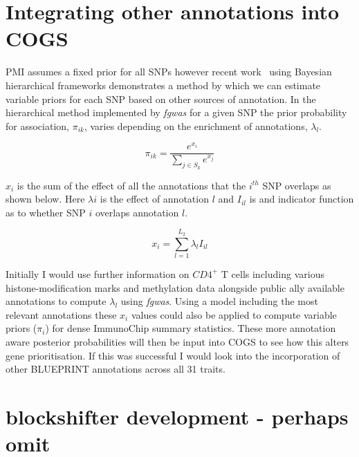 \documentclass[a4paper,11pt]{report}
\begin{document}
\section{Integrating other annotations into COGS}

PMI assumes a fixed prior for all SNPs however recent work~\citep{Pickrell2014-xs} using Bayesian hierarchical frameworks demonstrates a method by which we can estimate variable priors for each SNP based on other sources of annotation. In the hierarchical method implemented by \textit{fgwas} for a given SNP the prior probability for association, $\pi_{ik}$, varies depending on the enrichment of annotations, $\lambda_{l}$. 

\begin{equation}
	\pi_{ik} = \frac{e^{x_{i}}}{\sum_{j \in S_k}e^{x_{j}}}
\end{equation}

$x_i$ is the sum of the effect of all the annotations that the $i^{th}$ SNP overlaps as shown below.  Here $\lambda{i}$ is the effect of annotation $l$ and $I_{il}$ is and indicator function as to whether SNP $i$ overlaps annotation $l$.  

\begin{equation}
	x_{i} = \sum_{l=1}^{L_{2}} \lambda_{l}I_{il}
\end{equation}

Initially I would use further information on $CD4^{+}$ T cells including various histone-modification marks and methylation data alongside public ally available annotations to compute $\lambda_{l}$ using \textit{fgwas}.
 Using a model including the most relevant annotations these $x_{i}$ values could also be applied to compute variable priors ($\pi_{i}$) for dense ImmunoChip summary statistics. These more annotation aware posterior probabilities will then be input into COGS to see how this alters gene prioritisation. If this was successful I would look into the incorporation of other BLUEPRINT annotations across all 31 traits.
 

 \section{blockshifter development - perhaps omit}
 
\end{document}
